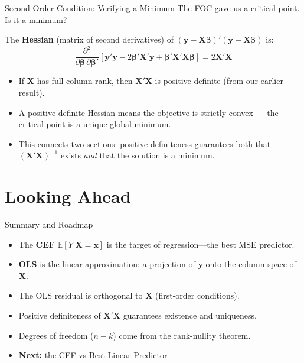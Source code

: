 \documentclass[aspectratio=169, handout, t]{beamer}
\numberwithin{equation}{section}
\begin{document}
\begin{frame}{Second-Order Condition: Verifying a Minimum}
The FOC gave us a critical point.  Is it a minimum?\pause
\bigskip

The \textbf{Hessian} (matrix of second derivatives) of $(\bm{y}-\bm{X}\bm{\beta})'(\bm{y}-\bm{X}\bm{\beta})$ is:
$$\frac{\partial^2}{\partial \bm{\beta}\,\partial \bm{\beta}'}\left[\bm{y}'\bm{y}-2\bm{\beta}'\bm{X}'\bm{y}+\bm{\beta}'\bm{X}'\bm{X}\bm{\beta}\right]=2\bm{X}'\bm{X}$$\pause

\begin{itemize}
\item If $\bm{X}$ has full column rank, then $\bm{X}'\bm{X}$ is positive definite (from our earlier result).\pause
\item A positive definite Hessian means the objective is strictly convex --- the critical point is a unique global minimum.\pause
\item This connects two sections: positive definiteness guarantees both that $(\bm{X}'\bm{X})^{-1}$ exists \emph{and} that the solution is a minimum.
\end{itemize}
\end{frame}

\section[Roadmap]{Looking Ahead}


\begin{frame}{Summary and Roadmap}
\begin{itemize}
\item The \textbf{CEF} $\mathbb{E}[Y|\bm{X}=\bm{x}]$ is the target of regression---the best MSE predictor.\pause
\item \textbf{OLS} is the linear approximation: a projection of $\bm{y}$ onto the column space of $\bm{X}$.\pause
\item The OLS residual is orthogonal to $\bm{X}$ (first-order conditions).
\item Positive definiteness of $\bm{X}'\bm{X}$ guarantees existence and uniqueness.\pause
\item Degrees of freedom ($n-k$) come from the rank-nullity theorem.
\bigskip
\item \textbf{Next:} the CEF vs Best Linear Predictor
\end{itemize}
\end{frame}
\end{document}
